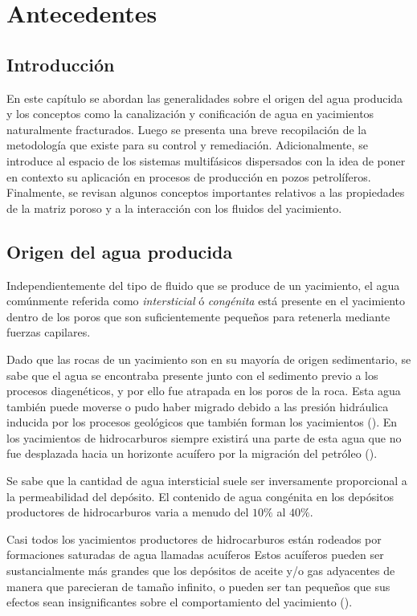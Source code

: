 \chapter{Antecedentes}
\label{chp:antecedentes}

\section{Introducción}
En este capítulo se abordan las generalidades sobre el origen del agua producida y los conceptos como la canalización y conificación de agua en yacimientos naturalmente fracturados. Luego se presenta una breve recopilación de la metodología que existe para su control y remediación. Adicionalmente, se introduce al espacio de los sistemas multifásicos dispersados con la idea de poner en contexto su aplicación en procesos de producción en pozos petrolíferos. Finalmente, se revisan algunos conceptos importantes relativos a las propiedades de la matriz poroso y a la interacción con los fluidos del yacimiento.

\section{Origen del agua producida}
Independientemente del tipo de fluido que se produce de un yacimiento, el agua comúnmente referida como \emph{intersticial} ó \emph{congénita} está presente en el yacimiento dentro de los poros que son suficientemente pequeños para retenerla mediante fuerzas capilares.

Dado que las rocas de un yacimiento son en su mayoría de origen sedimentario, se sabe que el agua se encontraba presente junto con el sedimento previo a los procesos diagenéticos, y por ello fue atrapada en los poros de la roca. Esta agua también puede moverse o pudo haber migrado debido a las presión hidráulica inducida por los procesos geológicos que también forman los yacimientos (\cite{Water1}). En los yacimientos de hidrocarburos siempre existirá una parte de esta agua que no fue desplazada hacia un horizonte acuífero por la migración del petróleo (\cite{StandardHandbook}).

Se sabe que la cantidad de agua intersticial suele ser inversamente proporcional a la permeabilidad del depósito. El contenido de agua congénita en los depósitos productores de hidrocarburos varia a menudo del $10\%$ al $40\%$.

Casi todos los yacimientos productores de hidrocarburos están rodeados por formaciones saturadas de agua llamadas acuíferos Estos acuíferos pueden ser sustancialmente más grandes que los depósitos de aceite y/o gas adyacentes de manera que parecieran de tamaño infinito, o pueden ser tan pequeños que sus efectos sean insignificantes sobre el comportamiento del yacimiento (\cite{Tarek}).

